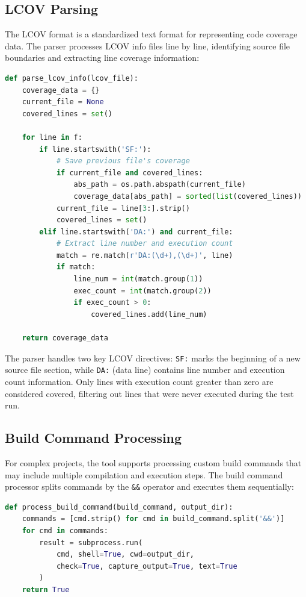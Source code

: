 \subsection{LCOV Parsing}

The LCOV format is a standardized text format for representing code coverage data. The parser processes LCOV info files line by line, identifying source file boundaries and extracting line coverage information:

\begin{lstlisting}[language=Python, caption={LCOV parsing algorithm}]
def parse_lcov_info(lcov_file):
    coverage_data = {}
    current_file = None
    covered_lines = set()
    
    for line in f:
        if line.startswith('SF:'):
            # Save previous file's coverage
            if current_file and covered_lines:
                abs_path = os.path.abspath(current_file)
                coverage_data[abs_path] = sorted(list(covered_lines))
            current_file = line[3:].strip()
            covered_lines = set()
        elif line.startswith('DA:') and current_file:
            # Extract line number and execution count
            match = re.match(r'DA:(\d+),(\d+)', line)
            if match:
                line_num = int(match.group(1))
                exec_count = int(match.group(2))
                if exec_count > 0:
                    covered_lines.add(line_num)
    
    return coverage_data
\end{lstlisting}

The parser handles two key LCOV directives: \texttt{SF:} marks the beginning of a new source file section, while \texttt{DA:} (data line) contains line number and execution count information. Only lines with execution count greater than zero are considered covered, filtering out lines that were never executed during the test run.

\subsection{Build Command Processing}

For complex projects, the tool supports processing custom build commands that may include multiple compilation and execution steps. The build command processor splits commands by the \texttt{\&\&} operator and executes them sequentially:

\begin{lstlisting}[language=Python, caption={Build command processing}]
def process_build_command(build_command, output_dir):
    commands = [cmd.strip() for cmd in build_command.split('&&')]
    for cmd in commands:
        result = subprocess.run(
            cmd, shell=True, cwd=output_dir,
            check=True, capture_output=True, text=True
        )
    return True
\end{lstlisting}

